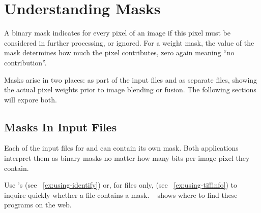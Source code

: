 

\chapter[Understanding Masks\commonpart]{\label{sec:understanding-masks}%
  Understanding Masks\commonpart}

%
%
%
A binary mask indicates for every pixel of an image if this pixel must be considered in further
processing, or ignored.  For a weight mask, the value of the mask determines how much the pixel
contributes, zero again meaning ``no contribution''.

Masks arise in two places: as part of the input files and as separate files, showing the actual
pixel weights prior to image blending or fusion.  The following sections will expore both.


\section[Masks In Input Files]{\label{sec:masks-in-input-files}%
  Masks In Input Files}

Each of the input files for \App{} and \OtherApp{} can contain its own mask.  Both applications
interpret them as binary masks no matter how many bits per image pixel they contain.

Use 's  (see
\exampleName~\ref{ex:using-identify}) or, for  files only,  (see \exampleName~\ref{ex:using-tiffinfo}) to inquire
quickly whether a file contains a mask.  \appendixName~ shows
where to find these programs on the web.

